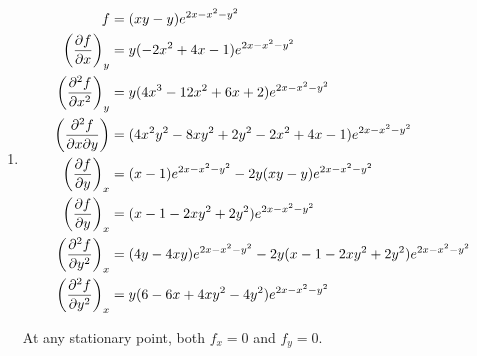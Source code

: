 \documentclass[10pt,\jkfside,a4paper]{article}
\begin{document}
\begin{enumerate}
\begin{enumerate}
\item 
\begin{equation}
\begin{split}
f &= (xy - y)e^{2x - x^{2} - y^{2}} \\
\left(\pdv{f}{x}\right)_y &= y(- 2x^{2} + 4x - 1)e^{2x - x^{2} - y^{2}} \\
\left(\pdv[2]{f}{x}\right)_y &= y(4x^3 - 12x^{2} + 6x + 2)e^{2x - x^{2} - y^{2}} \\
\left(\pdv[2]{f}{x}{y}\right) &= (4x^{2}y^{2} - 8xy^{2} + 2y^{2} - 2x^{2} + 4x - 1)e^{2x - x^{2} - y^{2}}\\
\left(\pdv{f}{y}\right)_x &= (x - 1)e^{2x - x^{2} - y^{2}} - 2y(xy - y)e^{2x - x^{2} - y^{2}} \\
\left(\pdv{f}{y}\right)_x &= (x - 1 - 2xy^{2} + 2y^{2})e^{2x - x^{2} - y^{2}} \\
\left(\pdv[2]{f}{y}\right)_x &= (4y - 4xy)e^{2x - x^{2} - y^{2}} - 2y(x - 1 - 2xy^{2} + 2y^{2})e^{2x - x^{2} - y^{2}} \\
\left(\pdv[2]{f}{y}\right)_x &= y(6 - 6x + 4xy^{2} - 4y^{2})e^{2x - x^{2} - y^{2}} \\
\end{split}
\end{equation}

At any stationary point, both $f_x = 0$ and $f_y = 0$.


\end{enumerate}
\end{enumerate}
\end{document}
